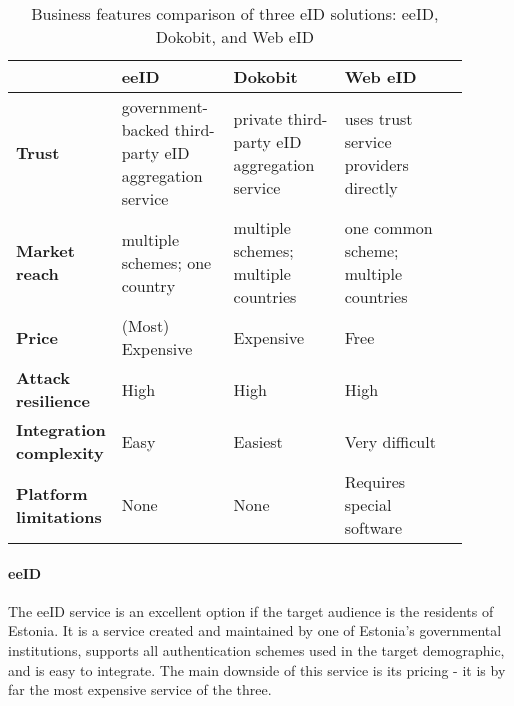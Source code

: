 \begin{table}
    \centering
    \begin{tabular}{ p{0.15\linewidth} | >{\raggedright}p{0.25\linewidth} | >{\raggedright}p{0.25\linewidth} | >{\raggedright}p{0.25\linewidth} p{0px}}
                                        & \textbf{eeID}                                         & \textbf{Dokobit}                            & \textbf{Web eID}                      & \\
        \hline
        \textbf{Trust}                  & government-backed third-party eID aggregation service & private third-party eID aggregation service & uses trust service providers directly & \\
        \hline
        \textbf{Market reach}           & multiple schemes; one country                         & multiple schemes; multiple countries        & one common scheme; multiple countries & \\
        \hline
        \textbf{Price}                  & (Most) Expensive                                      & Expensive                                   & Free                                  & \\
        \hline
        \textbf{Attack resilience}      & High                                                  & High                                        & High                                  & \\
        \hline
        \textbf{Integration complexity} & Easy                                                  & Easiest                                     & Very difficult                        & \\
        \hline
        \textbf{Platform limitations}   & None                                                  & None                                        & Requires special software             & \\
    \end{tabular}
    \caption{Business features comparison of three eID solutions: eeID, Dokobit, and Web eID}
    \label{tbl:summary-comparison-business}
\end{table}

\paragraph{eeID}

The eeID service is an excellent option if the target audience is the residents of Estonia. It is a service created and maintained by one of Estonia's governmental institutions, supports all authentication schemes used in the target demographic, and is easy to integrate. The main downside of this service is its pricing - it is by far the most expensive service of the three.

